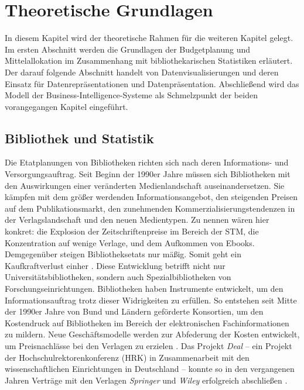 \chapter{Theoretische Grundlagen}
\label{chap:two}
In diesem Kapitel wird der theoretische Rahmen für die weiteren Kapitel gelegt. Im
ersten Abschnitt werden die Grundlagen der Budgetplanung und Mittelallokation im Zusammenhang mit bibliothekarischen Statistiken erläutert. 
Der darauf folgende Abschnitt handelt von Datenvisualisierungen und deren Einsatz
für Datenrepräsentationen und Datenpräsentation. Abschließend wird das Modell der Business-Intelligence-Systeme als Schmelzpunkt der 
beiden vorangegangen Kapitel eingeführt.

\section{Bibliothek und Statistik}
\label{chap:two_one}
Die Etatplanungen von Bibliotheken richten sich nach deren Informations- und Versorgungsauftrag. 
Seit Beginn der 1990er Jahre müssen sich Bibliotheken mit den Auswirkungen einer veränderten Medienlandschaft auseinandersetzen.
Sie kämpfen mit dem größer werdenden Informationsangebot, den steigenden Preisen auf dem Publikationsmarkt, 
den zunehmenden Kommerzialisierungstendenzen in der Verlagslandschaft und den neuen Medientypen. 
Zu nennen wären hier konkret: die Explosion der Zeitschriftenpreise im Bereich der \acrfull{STM}, die Konzentration auf wenige Verlage, 
und dem Aufkommen von Ebooks. Demgegenüber steigen Bibliotheksetats nur mäßig. 
Somit geht ein Kaufkraftverlust einher \cite[vgl.][164 ff.]{moravetz-kuhlmann_monika_erwerbungspolitik_2015}.
Diese Entwicklung betrifft nicht nur Universitätsbibliotheken, sondern auch Spezialbibliotheken von Forschungseinrichtungen.
Bibliotheken haben Instrumente entwickelt, um den Informationsauftrag trotz dieser Widrigkeiten zu erfüllen.
So entstehen seit Mitte der 1990er Jahre von Bund und Ländern geförderte Konsortien, um den Kostendruck auf Bibliotheken im Bereich der elektronischen
Fachinformationen zu mildern. Neue Geschäftsmodelle werden zur Abfederung der Kosten entwickelt, um Preisnachlässe bei den Verlagen zu erzielen
\cite[vgl.][169 ff.]{moravetz-kuhlmann_monika_erwerbungspolitik_2015}. Das Projekt \textit{Deal} -- ein Projekt der Hochschulrektorenkonferenz (HRK) in Zusammenarbeit mit den
wissenschaftlichen Einrichtungen in Deutschland -- konnte so in den vergangenen Jahren Verträge mit den Verlagen \textit{Springer} und \textit{Wiley} erfolgreich abschließen \cite[vgl.][]{projekt_deal_projekt_2020}.

